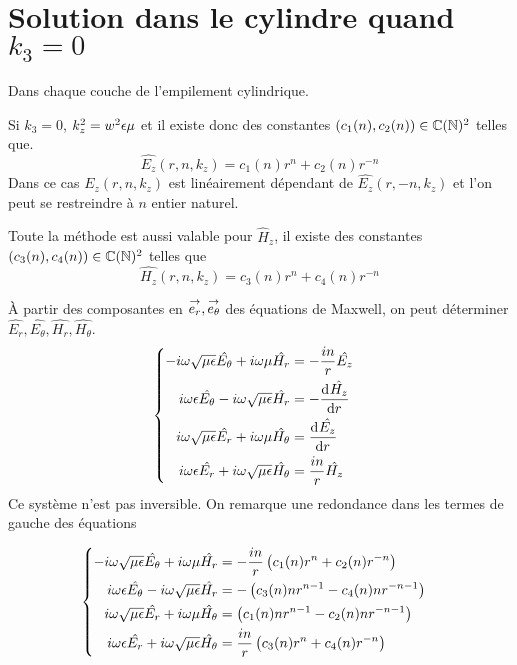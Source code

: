 \section[Solution dans le cylindre quand k3 = 0]{Solution dans le cylindre quand \(k_3 = 0\)}
  \label{sec:annexe:cylindre:k3_nul}

  Dans chaque couche de l'empilement cylindrique.

  Si \(k_3 = 0\), \(k_z^2 = w^2\eps\mu\) et il existe donc des constantes \((c_1(n),c_2(n)) \in \CC(\NN)^2\) telles que.
  \begin{equation*}
    \hat{E_z}(r,n,k_z) = c_1(n) r^n + c_2(n)r^{-n}
  \end{equation*}
  Dans ce cas \(\hat{E_z}(r,n,k_z)\) est linéairement dépendant de  \(\hat{E_z}(r,-n,k_z)\) et l'on peut se restreindre à \(n\) entier naturel.

  Toute la méthode est aussi valable pour \(\hat H_z\), il existe des constantes \((c_3(n),c_4(n)) \in \CC(\NN)^2\) telles que
  \begin{equation*}
    \hat{H_z}(r,n,k_z) = c_3(n) r^n + c_4(n)r^{-n}
  \end{equation*}

  À partir des composantes en \(\vect{e_r},\vect{e_\theta}\) des équations de Maxwell, on peut déterminer \(\hat{E_r},\hat{E_\theta},\hat{H_r},\hat{H_\theta}\).
  \begin{align*}
      &\left\lbrace
      \begin{aligned}
          -i\w\sqrt{\mu\eps}\hat{E_\theta} + i\w\mu \hat{H_r} &= -\frac{in}{r}\hat{E_z}
          \\
          i\w\eps \hat{E_\theta} - i\w\sqrt{\mu\eps} \hat{H_r} &= -\ddp{r}{\hat{H_z}}            
          \\
          i\w\sqrt{\mu\eps}\hat{E_r} + i\w\mu \hat{H_\theta} &= \ddp{r}{\hat{E_z}}
          \\
          i\w\eps \hat{E_r} + i\w\sqrt{\mu\eps} \hat{H_\theta} &= \frac{in}{r}\hat{H_z}
      \end{aligned}
      \right.
  \end{align*}
  Ce système n'est pas inversible. On remarque une redondance dans les termes de gauche des équations

  \begin{align*}
      &\left\lbrace
      \begin{aligned}
          -i\w\sqrt{\mu\eps}\hat{E_\theta} + i\w\mu \hat{H_r} &= -\frac{in}{r}\left(c_1(n) r^n + c_2(n)r^{-n}\right)
          \\
          i\w\eps \hat{E_\theta} - i\w\sqrt{\mu\eps} \hat{H_r} &= -\left(c_3(n)nr^{n-1} - c_4(n)nr^{-n-1}\right)           
          \\
          i\w\sqrt{\mu\eps}\hat{E_r} + i\w\mu \hat{H_\theta} &= \left(c_1(n)nr^{n-1} - c_2(n)nr^{-n-1}\right)
          \\
          i\w\eps \hat{E_r} + i\w\sqrt{\mu\eps} \hat{H_\theta} &= \frac{in}{r}\left(c_3(n) r^n + c_4(n)r^{-n}\right)
      \end{aligned}
      \right.
  \end{align*}

